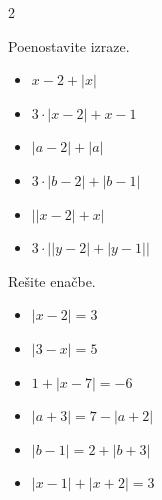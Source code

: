 \begin{multicols}{2}
\begin{naloga}
\begin{itemize}
            \end{itemize}
        \end{naloga}


        \begin{naloga}
            Poenostavite izraze.
            \begin{itemize}
                    \item $x-2+\left\lvert x\right\rvert$ 
                    \item $3\cdot\left\lvert x-2\right\rvert +x-1$ 
                    \item $\left\lvert a-2\right\rvert+\left\lvert a\right\rvert$ 
                    \item $3\cdot \left\lvert b-2\right\rvert+\left\lvert b-1 \right\rvert$ 
                    \item $\left\lvert \lvert x-2\rvert +x \right\rvert$ 
                    \item $3\cdot \left\lvert \lvert y-2\rvert +\lvert y-1\rvert \right\rvert$ 

            \end{itemize}
        \end{naloga}


        \begin{naloga}
            Rešite enačbe.
            \begin{itemize}
                    \item $\left\lvert x-2 \right\rvert =3$ 
                    \item $\left\lvert 3-x\right\rvert =5$ 
                    \item $1+ \left\lvert x-7 \right\rvert =-6$ 
                    \item $\left\lvert a+3 \right\rvert = 7- \left\lvert a+2 \right\rvert$ 
                    \item $\left\lvert b-1 \right\rvert = 2 + \left\lvert b+3 \right\rvert$ 
                    \item $\left\lvert x-1 \right\rvert + \left\lvert x+2 \right\rvert =3$ 

            \end{itemize}
        \end{naloga}


\end{multicols}
